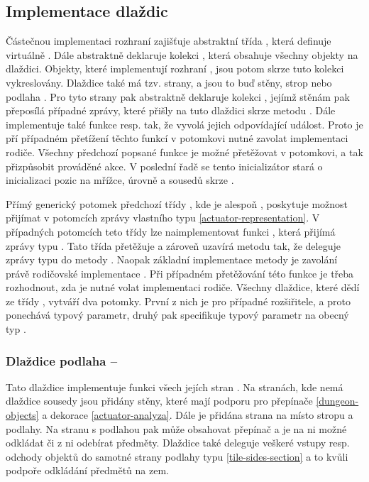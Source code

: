 \subsection{Implementace dlaždic}
Částečnou implementaci rozhraní  zajišťuje abstraktní třída , která definuje virtuálně .
Dále abstraktně deklaruje kolekci , která obsahuje všechny objekty na dlaždici. Objekty, které 
implementují rozhraní , jsou potom skrze tuto kolekci vykreslovány.
Dlaždice také má tzv. strany, a jsou to buď stěny, strop nebo podlaha .
Pro tyto strany pak abstraktně deklaruje kolekci , jejímž stěnám pak přeposílá
případné zprávy, které přišly na tuto dlaždici skrze metodu .
Dále implementuje také funkce  resp.  tak, že vyvolá jejich odpovídající událost.
Proto je pří případném přetížení těchto funkcí v potomkovi nutné zavolat implementaci rodiče. Všechny
předchozí popsané funkce je možné přetěžovat v potomkovi, a tak přizpůsobit prováděné akce.
V poslední řadě se tento inicializátor stará o inicializaci pozic na mřížce, úrovně a sousedů skrze . 


Přímý generický potomek předchozí třídy , kde  je alespoň ,
poskytuje možnost přijímat v potomcích zprávy vlastního typu \vref{actuator-representation}. V případných potomcích teto třídy 
lze naimplementovat funkci , která přijímá zprávy typu . Tato třída přetěžuje a zároveň 
uzavírá metodu  tak, že deleguje zprávy typu  do metody . 
Naopak základní implementace metody  je zavolání právě rodičovské implementace . 
Při případném přetěžování této funkce je třeba rozhodnout, zda je nutné volat implementaci rodiče. Všechny dlaždice,
které dědí ze třídy , vytváří dva potomky. První z nich je pro případné rozšiřitele,
a proto ponechává typový parametr, druhý pak specifikuje typový parametr na obecný typ .

\subsubsection{Dlaždice podlaha -- }
Tato dlaždice implementuje funkci všech jejích stran . Na stranách, kde
nemá dlaždice sousedy jsou přidány stěny, které mají podporu pro přepínače \vref{dungeon-objects} a dekorace \vref{actuator-analyza}.
Dále je přidána strana na místo stropu a podlahy. Na stranu s podlahou pak může obsahovat přepínač a je na ni možné odkládat
či z ni odebírat předměty. Dlaždice také deleguje veškeré vstupy resp. odchody objektů do samotné strany podlahy
typu  \vref{tile-sides-section} a to kvůli podpoře odkládání předmětů na zem.

